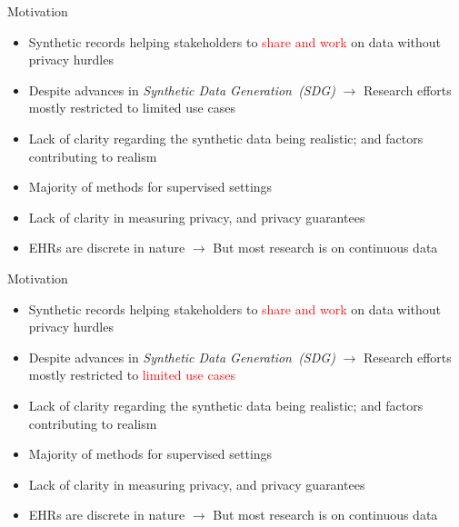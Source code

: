 \documentclass{beamer}
\begin{document}
\begin{frame}{Motivation}

\begin{itemize}
  \item Synthetic records helping stakeholders to \textcolor{red}{share and work} on data without privacy hurdles
  \item \textcolor{mygray}{Despite advances in \textit{Synthetic Data Generation~(SDG)} $\rightarrow$ Research efforts mostly restricted to limited use cases}
  \item \textcolor{mygray}{Lack of clarity regarding the synthetic data being realistic; and factors contributing to realism}
  \item \textcolor{mygray}{Majority of methods for supervised settings}
  \item \textcolor{mygray}{Lack of clarity in measuring privacy, and privacy guarantees}
  \item \textcolor{mygray}{EHRs are discrete in nature $\rightarrow$ But most research is on continuous data}
  
  
  
\end{itemize}

\end{frame}



\begin{frame}{Motivation}
\addtocounter{framenumber}{-1}

\begin{itemize}
  \item Synthetic records helping stakeholders to \textcolor{red}{share and work} on data without privacy hurdles
  \item Despite advances in \textit{Synthetic Data Generation~(SDG)} $\rightarrow$ Research efforts mostly restricted to \textcolor{red}{limited use cases}
  \item \textcolor{mygray}{Lack of clarity regarding the synthetic data being realistic; and factors contributing to realism}
  \item\textcolor{mygray}{ Majority of methods for supervised settings}
  \item \textcolor{mygray}{Lack of clarity in measuring privacy, and privacy guarantees}
  \item \textcolor{mygray}{EHRs are discrete in nature $\rightarrow$ But most research is on continuous data}
  
  
  
\end{itemize}

\end{frame}
\end{document}
